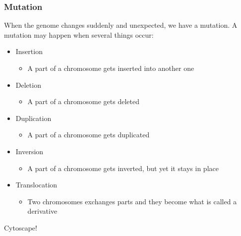 \documentclass[UKenglish,11pt,twoside,a4paper]{report}
\begin{document}
\subsubsection*{Mutation}
When the genome changes suddenly and unexpected, we have a mutation. A mutation may happen when several things occur:
\begin{itemize}
    \item Insertion
        \begin{itemize}
            \item A part of a chromosome gets inserted into another one
        \end{itemize}
    \item Deletion
        \begin{itemize}
            \item A part of a chromosome gets deleted
        \end{itemize}
    \item Duplication
        \begin{itemize}
            \item A part of a chromosome gets duplicated
        \end{itemize}
    \item Inversion
        \begin{itemize}
            \item A part of a chromosome gets inverted, but yet it stays in place
        \end{itemize}
    \item Translocation
        \begin{itemize}
            \item Two chromosomes exchanges parts and they become what is called a derivative
        \end{itemize}
\end{itemize}
Cytoscape!\cite{tester}
\printbibliography
\end{document}
